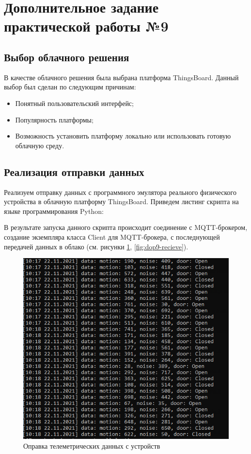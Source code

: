 \documentclass[a4paper,14pt]{extarticle}
\begin{document}
\newpage

\section{Дополнительное задание практической работы №9}
\subsection{Выбор облачного решения}

В качестве облачного решения была выбрана платформа ThingsBoard. Данный выбор был сделан по следующим причинам:
\begin{itemize}
	\item Понятный пользовательский интерфейс;
	\item Популярность платформы;
	\item Возможность установить платформу локально или использовать готовую облачную среду.
\end{itemize}


\subsection{Реализация отправки данных}

Реализуем отправку данных с программного эмулятора реального физического устройства в облачную платформу ThingsBoard. Приведем листинг скрипта на языке программирования Python:



В результате запуска данного скрипта происходит соединение с MQTT-брокером, создание экземпляра класса Client для MQTT-брокера, с последнующей передачей данных в облако (см. рисунки \ref{fig:dop9-send},  \ref{fig:dop9-recieve}).


\begin{figure}[h!]
	\centering
	\includegraphics[width=0.6\linewidth]{images/dop9-send}
	\caption{Оправка телеметрических данных с устройств }
	\label{fig:dop9-send}
\end{figure}
\end{document}

